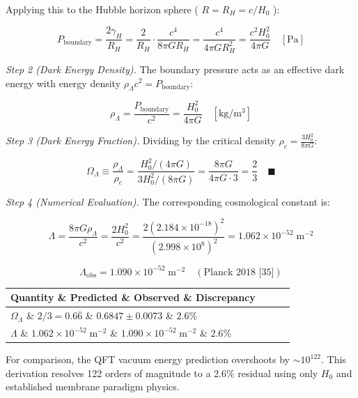 \documentclass[11pt,a4paper]{article}
\theoremstyle{definition}\newtheorem{definition}{Definition}
\theoremstyle{remark}\newtheorem{remark}{Remark}
\begin{document}
Applying this to the Hubble horizon sphere ( $R = R_H = c/H_0$ ):


\begin{equation}
P_{\text{boundary}} = \frac{2\gamma_H}{R_H} = \frac{2}{R_H} \cdot \frac{c^4}{8\pi G R_H} = \frac{c^4}{4\pi G R_H^2} = \frac{c^2 H_0^2}{4\pi G} \quad [\mathrm{Pa}]
\end{equation}


\textit{Step 2 (Dark Energy Density).} The boundary pressure acts as an effective dark energy with energy density $\rho_\Lambda c^2 = P_{\text{boundary}}$:


\begin{equation}
\rho_\Lambda = \frac{P_{\text{boundary}}}{c^2} = \frac{H_0^2}{4\pi G} \quad [\mathrm{kg/m^3}]
\end{equation}


\textit{Step 3 (Dark Energy Fraction).} Dividing by the critical density $\rho_c = \frac{3 H_0^2}{8\pi G}$:


\begin{equation}
\Omega_\Lambda \equiv \frac{\rho_\Lambda}{\rho_c} = \frac{H_0^2 / (4\pi G)}{3 H_0^2 / (8\pi G)} = \frac{8\pi G}{4\pi G \cdot 3} = \frac{2}{3} \quad \blacksquare
\end{equation}


\textit{Step 4 (Numerical Evaluation).} The corresponding cosmological constant is:


\begin{equation}
\Lambda = \frac{8\pi G \rho_\Lambda}{c^2} = \frac{2 H_0^2}{c^2} = \frac{2 (2.184 \times 10^{-18})^2}{(2.998 \times 10^8)^2} = 1.062 \times 10^{-52} \; \mathrm{m^{-2}}
\end{equation}



\begin{equation}
\Lambda_{\text{obs}} = 1.090 \times 10^{-52} \; \mathrm{m^{-2}} \quad (\text{Planck 2018 [35]})
\end{equation}


\begin{longtable}{llll}
\hline
Quantity \& Predicted \& Observed \& Discrepancy \\
\hline
$\Omega_\Lambda$ \& $2/3 = 0.6\overline{6}$ \& $0.6847 \pm 0.0073$ \& $2.6\%$ \\
$\Lambda$ \& $1.062 \times 10^{-52} \; \mathrm{m^{-2}}$ \& $1.090 \times 10^{-52} \; \mathrm{m^{-2}}$ \& $2.6\%$ \\
\hline
\end{longtable}
For comparison, the QFT vacuum energy prediction overshoots by $\sim 10^{122}$. This derivation resolves 122 orders of magnitude to a 2.6\% residual using only $H_0$ and established membrane paradigm physics.
\end{document}
